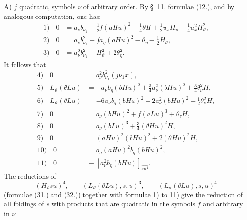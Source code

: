 \documentclass[11pt]{article}
\begin{document}
A) $f$ quadratic, symbols $\nu$ of arbitrary order. By \S\ 11, formulae (12.), and by analogous computation, one has:
\begin{align*}
1)\quad 0&=a_\nu b_{\nu_1}+\frac12f(aHu)^2-\frac14\theta H+\frac12u_xH_\vartheta-\frac14u_x^2H_\vartheta^2,\\
2)\quad 0&=a_\nu b_{\nu_1}^2+f a_\eta(aHu)^2-\theta_\eta-\frac12H_\vartheta,\\
3)\quad 0&=a_\nu^2b_{\nu_1}^2-H_\vartheta^2+2\theta_\eta^2.
\end{align*}
It follows that
\begin{align*}
4)\quad 0&=a_\nu^2b_{\nu_1}^2(j\nu_1x),\\
5)\quad L_\vartheta(\theta Lu)&=-a_\nu b_\eta(bHu)^2+\frac34a_\nu^2(bHu)^2+\frac34\theta_\nu^2H,\\
6)\quad L_\vartheta(\theta Lu)&=-6a_\nu b_\eta(bHu)^2+2a_\nu^2(bHu)^2-\frac12\theta_\nu^2H,\\
7)\quad 0&=a_\nu(bHu)^2+f(aLu)^3+\theta_\nu H,\\
8)\quad 0&=a_\nu(bLu)^3+\frac34(\theta Hu)^2H,\\
9)\quad 0&=(aHu)^2(bHu)^2+2(\theta Hu)^2H,\\
10)\quad 0&=a_\eta(aHu)^2b_\eta(bHu)^2,\\
11)\quad 0&\equiv [a_\nu^2b_\eta(bHu)]_{\widehat{su^4}}.
\end{align*}
The reductions of
\[
(H_\vartheta su)^4,
\qquad (L_\vartheta(\theta Lu),s,u)^3,
\qquad (L_\vartheta(\theta Lu),s,u)^4
\]
(formulae (31.) and (32.)) together with formulae 1) to 11) give the reduction of all foldings of $s$ with products that are quadratic in the symbols $f$ and arbitrary in $\nu$.
\end{document}
